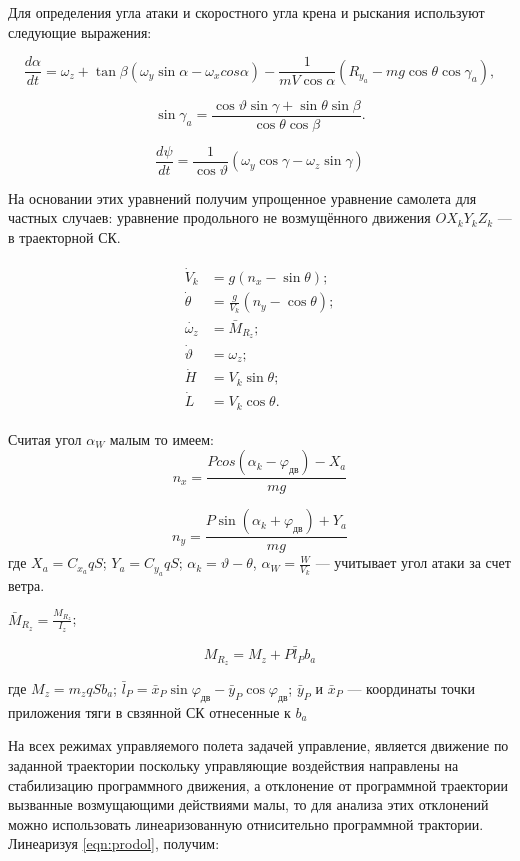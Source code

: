 \documentclass{article}
\begin{document}
Для определения угла атаки и скоростного угла крена и рыскания используют следующие выражения:

\[
\frac{d\alpha}{dt} = \omega_z + \tan{\beta}(\omega_y \sin{\alpha} - \omega_x cos{\alpha}) - \frac{1}{mV \cos{\alpha}} (R_{y_a} - mg\cos{\theta} \cos{\gamma_a}),
\]

\[
\sin{\gamma_a} = \frac{\cos{\vartheta} \sin{\gamma} + \sin{\theta} \sin{\beta}}{\cos{\theta} \cos{\beta}}.
\]

\[
\frac{d\psi}{dt} = \frac{1}{\cos{\vartheta}}(\omega_y \cos{\gamma} - \omega_z \sin{\gamma}) 
\]

На основании этих уравнений получим упрощенное уравнение самолета для частных случаев:
уравнение продольного не возмущённого движения $OX_k Y_k Z_k$ --- в траекторной СК.

\begin{align}
\label{eqn:prodol}
\begin{split}
\dot{V}_k&= g(n_x - \sin{\theta});
\\
\dot{\theta}&= \frac{g}{V_k} (n_y - \cos{\theta});
\\
\dot{\omega_z}&= \bar{M}_{R_z};
\\
\dot{\vartheta}&= \omega_{z};
\\
\dot{H}&= V_k \sin{\theta};
\\
\dot{L}&= V_k \cos{\theta}.
\end{split}
\end{align}

Считая угол $\alpha_W$ малым то имеем:
\[
n_x = \frac{Pcos{(\alpha_k - \varphi_{дв})} - X_a}{mg}
\]

\[
n_y = \frac{P \sin{(\alpha_k + \varphi_{дв})} + Y_a}{mg}
\]
где $X_a = C_{x_a} q S$; $Y_a = C_{y_a} q S$; $\alpha_k = \vartheta - \theta$, 
$\alpha_W = \frac{W}{V_k}$ --- учитывает угол атаки за счет ветра.

$\bar{M}_{R_z} = \frac{M_{R_z}}{I_z}$; 

\[
M_{R_z} = M_z + P \bar{l}_P b_a
\]

где $M_z = m_zqS b_a$; $\bar{l}_P = \bar{x}_P \sin{\varphi_{дв}} - \bar{y}_P \cos{\varphi_{дв}}$; $\bar{y}_P$ и $\bar{x}_P$ --- координаты точки приложения тяги в свзянной СК отнесенные к $b_a$

На всех режимах управляемого полета задачей управление, является движение по заданной траектории поскольку управляющие воздействия направлены на стабилизацию программного движения, а отклонение от программной траектории вызванные возмущающими действиями малы, то для анализа этих отклонений можно использовать линеаризованную отнисительно программной трактории. Линеаризуя \eqref{eqn:prodol}, получим: 
\end{document}

